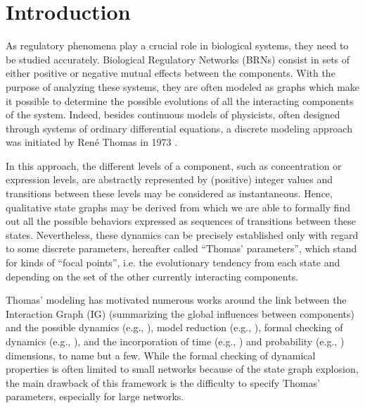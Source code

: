 \section{Introduction}\label{sec:intro}




As regulatory phenomena play a crucial role in biological systems, they need to be studied accurately.
Biological Regulatory Networks (BRNs) consist in sets of either positive or negative mutual effects between the components.
With the purpose of analyzing these systems, they are often modeled as graphs which make it possible to determine the possible evolutions of all the interacting components of the system.
Indeed, besides continuous models of physicists, often designed through systems of ordinary
differential equations, a discrete modeling approach was initiated by René Thomas in 1973
\cite{Thomas73}.

In this approach, the different levels of a component, such as concentration or expression levels, are abstractly represented by (positive) integer values and transitions between these levels may be considered as instantaneous.
Hence, qualitative state graphs may be derived from which we are able to formally find out all the possible behaviors expressed as sequences of transitions between these states.
Nevertheless, these dynamics can be precisely established only with regard to some discrete parameters,
hereafter called ``Thomas' parameters'',
which stand for kinds of ``focal points'', i.e. the evolutionary tendency from each state and depending on the set of the other currently interacting components.

Thomas' modeling has motivated numerous works around the link between the Interaction Graph (IG)
(summarizing the global influences between components) and the possible dynamics (e.g.,
\cite{RiCo07,RRT08}),
model reduction (e.g., \cite{Naldi09}), formal checking of dynamics (e.g., \cite{Richard06,Naldi07}), 
and the incorporation of time (e.g., \cite{Siebert06,Ahmad08}) and probability
(e.g., \cite{Twardziok10-CMSB}) dimensions, to name but a few.
While the formal checking of dynamical properties is often limited to small networks because of the
state graph explosion, the main drawback of this framework is the difficulty to specify Thomas'
parameters, especially for large networks.

